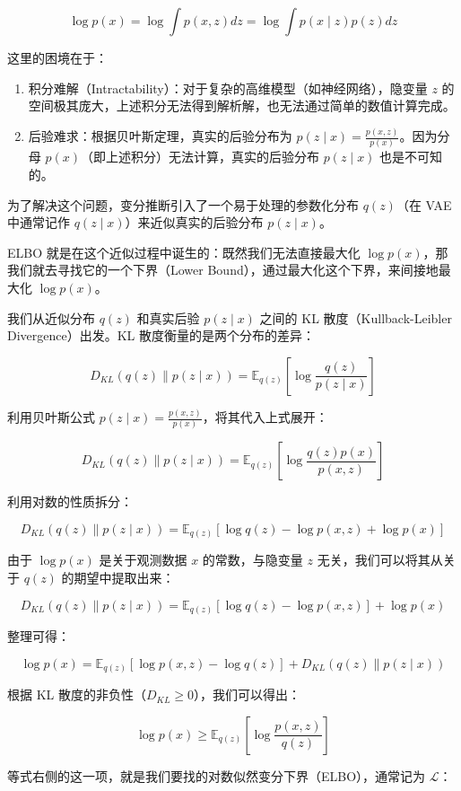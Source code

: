 \[
\log p(x)=\log\int p(x,z)dz=\log\int p(x\mid z)p(z)dz
\]

这里的困境在于：

\begin{enumerate}
\def\labelenumi{\arabic{enumi}.}
\tightlist
\item
  积分难解（Intractability）：对于复杂的高维模型（如神经网络），隐变量 \(z\) 的空间极其庞大，上述积分无法得到解析解，也无法通过简单的数值计算完成。
\item
  后验难求：根据贝叶斯定理，真实的后验分布为 \(p(z\mid x)=\frac{p(x,z)}{p(x)}\)。因为分母 \(p(x)\)（即上述积分）无法计算，真实的后验分布 \(p(z\mid x)\) 也是不可知的。
\end{enumerate}

为了解决这个问题，变分推断引入了一个易于处理的参数化分布 \(q(z)\)（在 VAE 中通常记作 \(q(z\mid x)\)）来近似真实的后验分布 \(p(z\mid x)\)。

ELBO 就是在这个近似过程中诞生的：既然我们无法直接最大化 \(\log p(x)\)，那我们就去寻找它的一个下界（Lower Bound），通过最大化这个下界，来间接地最大化 \(\log p(x)\)。

我们从近似分布 \(q(z)\) 和真实后验 \(p(z\mid x)\) 之间的 KL 散度（Kullback-Leibler Divergence）出发。KL 散度衡量的是两个分布的差异：

\[
D_{KL}(q(z)\parallel p(z\mid x))=\mathbb{E}_{q(z)}\left[\log\frac{q(z)}{p(z\mid x)}\right]
\]

利用贝叶斯公式 \(p(z\mid x)=\frac{p(x,z)}{p(x)}\)，将其代入上式展开：

\[
D_{KL}(q(z)\parallel p(z\mid x))=\mathbb{E}_{q(z)}\left[\log\frac{q(z)p(x)}{p(x,z)}\right]
\]

利用对数的性质拆分：

\[
D_{KL}(q(z)\parallel p(z\mid x))=\mathbb{E}_{q(z)}[\log q(z)-\log p(x,z)+\log p(x)]
\]

由于 \(\log p(x)\) 是关于观测数据 \(x\) 的常数，与隐变量 \(z\) 无关，我们可以将其从关于 \(q(z)\) 的期望中提取出来：

\[
D_{KL}(q(z)\parallel p(z\mid x))=\mathbb{E}_{q(z)}[\log q(z)-\log p(x,z)]+\log p(x)
\]

整理可得：

\[
\log p(x)=\mathbb{E}_{q(z)}[\log p(x,z)-\log q(z)]+D_{KL}(q(z)\parallel p(z\mid x))
\]

根据 KL 散度的非负性（\(D_{KL}\ge 0\)），我们可以得出：

\[
\log p(x)\ge \mathbb{E}_{q(z)}\left[\log\frac{p(x,z)}{q(z)}\right]
\]

等式右侧的这一项，就是我们要找的对数似然变分下界（ELBO），通常记为 \(\mathcal{L}\)：


